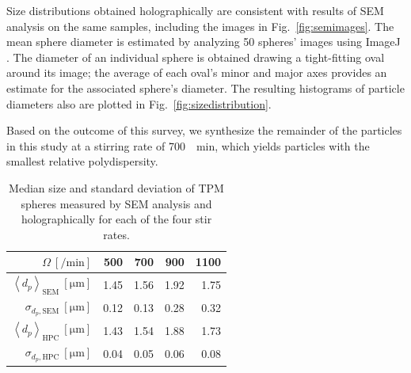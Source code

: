 \documentclass[journal=langd5,manuscript=article,layout=twocolumn]{achemso}
\newcommand{\avg}[1]{\left< #1 \right>}
\begin{document}


Size distributions obtained holographically are consistent with results 
of SEM analysis on the same samples, including
the images in Fig.~\ref{fig:semimages}.
The mean sphere diameter is estimated by analyzing \num{50} spheres' images using ImageJ \cite{mazzoli12}. %
The diameter of an individual sphere is obtained 
drawing a tight-fitting oval around its image;
the average of each oval's minor and major axes provides an estimate for the
associated sphere's diameter.
The resulting histograms of particle diameters
also are plotted in Fig.~\ref{fig:sizedistribution}.

Based on the outcome of this survey, we synthesize
the remainder of the particles in this study
at a stirring rate of \SI{700}{\per\minute},
which yields particles with the smallest
relative polydispersity.

\begin{table}[!t]
\centering
\caption{Median size and standard deviation of TPM spheres measured by SEM analysis 
and holographically for each of the four stir rates.}
\begin{tabular}{rrrrr}
\hline
\hline
$\Omega~[\si{\per\minute}]$ & \num{500} & \num{700}& \num{900} & \num{1100} \\
\hline
$\avg{d_p}_{\text{SEM}}~[\si{\um}]$ & 1.45 & 1.56 & 1.92 & 1.75 \\ 
$\sigma_{d_p, \text{SEM}}~[\si{\um}]$ & 0.12 & 0.13 & 0.28 & 0.32 \\ 
$\avg{d_p}_{\text{HPC}}~[\si{\um}]$ & 1.43 & 1.54 & 1.88 & 1.73 \\ 
$\sigma_{d_p, \text{HPC}}~[\si{\um}]$ & 0.04 & 0.05 & 0.06 & 0.08 \\ 
\hline \hline
\end{tabular}
\label{table:sem_data}
\end{table}
\end{document}
